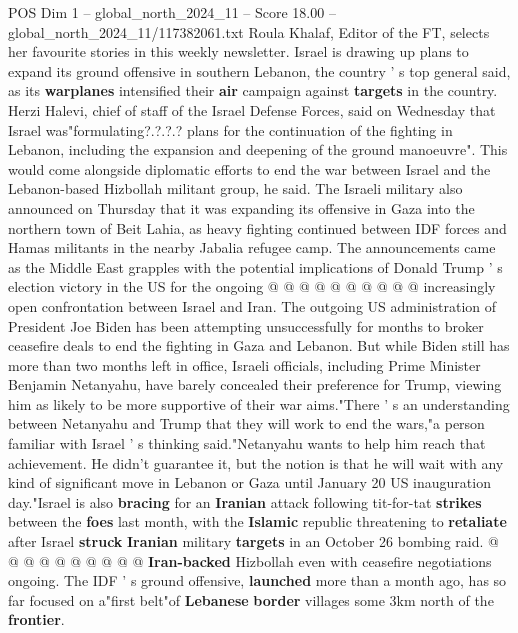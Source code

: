 \begin{textsample}{POS Dim 1 – global\_north\_2024\_11 – Score 18.00 – global\_north\_2024\_11/117382061.txt}  \label{ex:f1_pos_237}
Roula Khalaf, Editor of the FT, selects her favourite stories in this weekly newsletter.
Israel is drawing up plans to expand its ground offensive in southern Lebanon, the country ' s top general said, as its \textbf{warplanes} intensified their \textbf{air} campaign against \textbf{targets} in the country.
Herzi Halevi, chief of staff of the Israel Defense Forces, said on Wednesday that Israel was"formulating?.?.?.? plans for the continuation of the fighting in Lebanon, including the expansion and deepening of the ground manoeuvre".
This would come alongside diplomatic efforts to end the war between Israel and the Lebanon-based Hizbollah militant group, he said.
The Israeli military also announced on Thursday that it was expanding its offensive in Gaza into the northern town of Beit Lahia, as heavy fighting continued between IDF forces and Hamas militants in the nearby Jabalia refugee camp.
The announcements came as the Middle East grapples with the potential implications of Donald Trump ' s election victory in the US for the ongoing @ @ @ @ @ @ @ @ @ @ increasingly open confrontation between Israel and Iran.
The outgoing US administration of President Joe Biden has been attempting unsuccessfully for months to broker ceasefire deals to end the fighting in Gaza and Lebanon.
But while Biden still has more than two months left in office, Israeli officials, including Prime Minister Benjamin Netanyahu, have barely concealed their preference for Trump, viewing him as likely to be more supportive of their war aims."There ' s an understanding between Netanyahu and Trump that they will work to end the wars,"a person familiar with Israel ' s thinking said."Netanyahu wants to help him reach that achievement.
He didn't guarantee it, but the notion is that he will wait with any kind of significant move in Lebanon or Gaza until January 20 US inauguration day."Israel is also \textbf{bracing} for an \textbf{Iranian} attack following tit-for-tat \textbf{strikes} between the \textbf{foes} last month, with the \textbf{Islamic} republic threatening to \textbf{retaliate} after Israel \textbf{struck} \textbf{Iranian} military \textbf{targets} in an October 26 bombing raid. @ @ @ @ @ @ @ @ @ @ \textbf{Iran-backed} Hizbollah even with ceasefire negotiations ongoing.
The IDF ' s ground offensive, \textbf{launched} more than a month ago, has so far focused on a"first belt"of \textbf{Lebanese} \textbf{border} villages some 3km north of the \textbf{frontier}.

\end{textsample}
